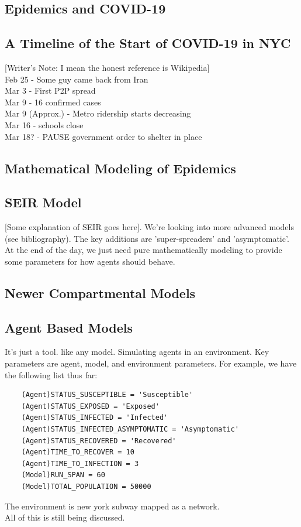\documentclass[12pt, a4, epsf] {article}
\theoremstyle{plain}
\theoremstyle{definition}
\begin{document}
\subsection*{Epidemics and COVID-19}
\subsection*{A Timeline of the Start of COVID-19 in NYC}
[Writer's Note: I mean the honest reference is Wikipedia]\\
Feb 25 - Some guy came back from Iran\\
Mar 3 - First P2P spread\\
Mar 9 - 16 confirmed cases\\
Mar 9 (Approx.) - Metro ridership starts decreasing\\
Mar 16 - schools close\\
Mar 18? - PAUSE government order to shelter in place\\
\subsection*{Mathematical Modeling of Epidemics}
\subsection*{SEIR Model}
[Some explanation of SEIR goes here]. We're looking into more advanced models (see bibliography). The key additions are 'super-spreaders' and 'asymptomatic'. At the end of the day, we just need pure mathematically modeling to provide some parameters for how agents should behave. 
\subsection*{Newer Compartmental Models}
\subsection*{Agent Based Models}
It's just a tool. like any model. Simulating agents in an environment. Key parameters are agent, model, and environment parameters. For example, we have the following list thus far:\\
\begin{verbatim}
	(Agent)STATUS_SUSCEPTIBLE = 'Susceptible'
	(Agent)STATUS_EXPOSED = 'Exposed'
	(Agent)STATUS_INFECTED = 'Infected'
	(Agent)STATUS_INFECTED_ASYMPTOMATIC = 'Asymptomatic'
	(Agent)STATUS_RECOVERED = 'Recovered'
	(Agent)TIME_TO_RECOVER = 10
	(Agent)TIME_TO_INFECTION = 3
	(Model)RUN_SPAN = 60
	(Model)TOTAL_POPULATION = 50000
\end{verbatim}
The environment is new york subway mapped as a network.\\ 
All of this is still being discussed.\\
\end{document}
